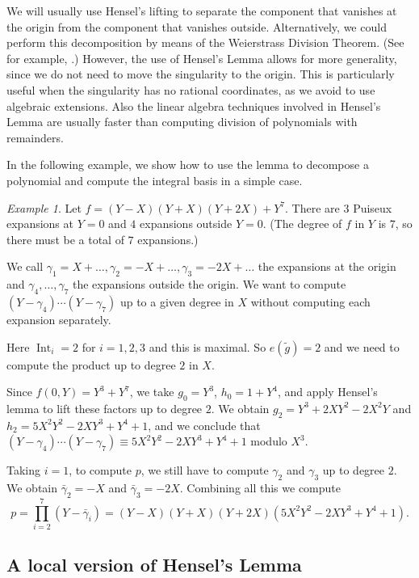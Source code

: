 \documentclass[a4paper,11pt]{amsart}%
\theoremstyle{definition}
\theoremstyle{plain}
\theoremstyle{remark}
\newtheorem{example}[defn]{Example}
\DeclareMathOperator{\Int}{Int}
\begin{document}
We will usually use Hensel's lifting to separate the component that vanishes
at the origin from the component that vanishes outside. Alternatively, we
could perform this decomposition by means of the Weierstrass Division Theorem.
(See for example, \cite[Theorem 3.2.3]{JP}.) However, the use of Hensel's
Lemma allows for more generality, since we do not need to move the singularity
to the origin. This is particularly useful when the singularity has no
rational coordinates, as we avoid to use algebraic extensions. Also the linear
algebra techniques involved in Hensel's Lemma are usually faster than
computing division of polynomials with remainders.

In the following example, we show how to use the lemma to decompose a
polynomial and compute the integral basis in a simple case.

\begin{example}
Let $f = (Y-X)(Y+X)(Y+2X) + Y^{7}$. There are $3$ Puiseux expansions at $Y =
0$ and $4$ expansions outside $Y = 0$. (The degree of $f$ in $Y$ is $7$, so
there must be a total of $7$ expansions.)

We call $\gamma_{1} = X + \dots, \gamma_{2} = -X + \dots, \gamma_{3} = -2X +
\dots$ the expansions at the origin and $\gamma_{4}, \dots, \gamma_{7}$ the
expansions outside the origin. We want to compute $(Y-\gamma_{4}%
)\cdots(Y-\gamma_{7})$ up to a given degree in $X$ without computing each
expansion separately.

Here $\Int_{i} = 2$ for $i = 1, 2, 3$ and this is maximal. So $e(\tilde g) =
2$ and we need to compute the product up to degree $2$ in $X$.

Since $f(0, Y) = Y^{3} + Y^{7}$, we take $g_{0} = Y^{3}$, $h_{0} = 1 + Y^{4}$,
and apply Hensel's lemma to lift these factors up to degree $2$. We obtain
$g_{2} = Y^{3} + 2XY^{2} -2X^{2}Y$ and $h_{2} = 5X^{2}Y^{2}-2XY^{3}+Y^{4}+1$,
and we conclude that $(Y-\gamma_{4})\cdots(Y-\gamma_{7}) \equiv5X^{2}%
Y^{2}-2XY^{3}+Y^{4}+1$ modulo $X^{3}$.

Taking $i = 1$, to compute $p$, we still have to compute $\gamma_{2}$ and
$\gamma_{3}$ up to degree $2$. We obtain $\bar\gamma_{2} = -X$ and $\bar
\gamma_{3} = -2X$. Combining all this we compute
\[
p = \prod_{i=2}^{7} (Y - \bar\gamma_{i}) = (Y-X)(Y+X)(Y+2X)(5X^{2}Y^{2}%
-2XY^{3}+Y^{4}+1).
\]

\end{example}

\subsection{A local version of Hensel's Lemma}
\end{document}
